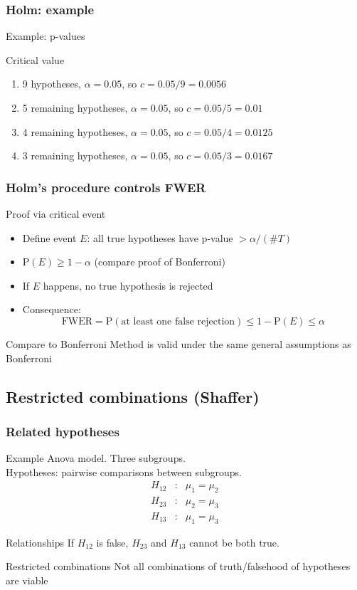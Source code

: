 \documentclass[compress]{beamer}
\newcommand{\bb}[1]{\begin{block}{#1}}
\newcommand{\eb}{\end{block}}
\newcommand{\bi}{\begin {itemize}}
\newcommand{\ei}{\end{itemize}}
\newcommand{\be}{\begin {enumerate}}
\newcommand{\ee}{\end{enumerate}}
\newcommand{\bfr}[1]{\begin{frame} \frametitle{#1}}
\begin{document}
\bfr{Holm: example}
  \bb{Example: p-values}
  \hspace*{-1cm}
  {\footnotesize
  }
  \eb
  \bb{Critical value}
    \be
      \item 9 hypotheses, $\alpha=0.05$, so $c = 0.05/9 = 0.0056$
      \item<3-> 5 remaining hypotheses, $\alpha=0.05$, so $c = 0.05/5 = 0.01$
      \item<5-> 4 remaining hypotheses, $\alpha=0.05$, so $c = 0.05/4 = 0.0125$
      \item<7> 3 remaining hypotheses, $\alpha=0.05$, so $c = 0.05/3 = 0.0167$
    \ee
  \eb
\end{frame}


\bfr{Holm's procedure controls FWER}
  \bb{Proof via critical event}
    \bi
      \item Define event $E$: all true hypotheses have p-value $> \alpha/(\#T)$
      \item $\mathrm{P}(E)\geq1-\alpha$ (compare proof of Bonferroni)
      \item If $E$ happens, no true hypothesis is rejected
      \item Consequence:
      \[
      \textrm{FWER} = \mathrm{P}(\textrm{at least one false rejection}) \leq 1-\mathrm{P}(E)\leq\alpha
      \]
    \ei
  \eb
  \bb{Compare to Bonferroni}
    Method is valid under the same general assumptions as Bonferroni
  \eb
\end{frame}


\subsection{Restricted combinations (Shaffer)}

\bfr{Related hypotheses}
  \bb{Example}
    Anova model. Three subgroups.\\
    Hypotheses: pairwise comparisons between subgroups.
    \begin{eqnarray*}
      H_{12}&:& \mu_1=\mu_2\\
      H_{23}&:& \mu_2=\mu_3\\
      H_{13}&:& \mu_1=\mu_3
    \end{eqnarray*}
  \eb
  \bb{Relationships}
    If $H_{12}$ is false, $H_{23}$ and $H_{13}$ cannot be both true.
  \eb
  \bb{Restricted combinations}
    Not all combinations of truth/falsehood of hypotheses are viable
  \eb
\end{frame}
\end{document}
